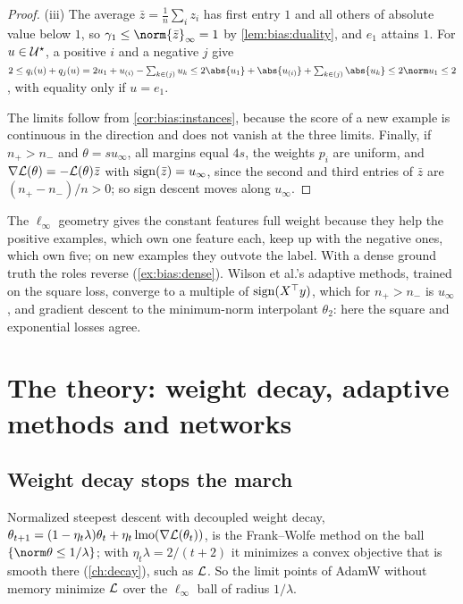 \begin{refsection}
\begin{proof}
(iii) The average $\bar z=\frac1n\sum_iz_i$ has first entry $1$ and all others of absolute value below $1$, so $\gamma_1\le\norm{\bar z}_\infty=1$ by \cref{lem:bias:duality}, and $e_1$ attains $1$. For $u\in\mathcal{U}^\star$, a positive $i$ and a negative $j$ give $2\le q_i(u)+q_j(u)=2u_1+u_{(i)}-\sum_{k\in(j)}u_k\le2\abs{u_1}+\abs{u_{(i)}}+\sum_{k\in(j)}\abs{u_k}\le2\norm u_1\le2$, with equality only if $u=e_1$.

The limits follow from \cref{cor:bias:instances}, because the score of a new example is continuous in the direction and does not vanish at the three limits. Finally, if $n_+>n_-$ and $\theta=su_\infty$, all margins equal $4s$, the weights $p_i$ are uniform, and $\nabla\mathcal{L}(\theta)=-\mathcal{L}(\theta)\bar z$ with $\operatorname{sign}(\bar z)=u_\infty$, since the second and third entries of $\bar z$ are $(n_+-n_-)/n>0$; so sign descent moves along $u_\infty$.
\end{proof}

The $\ell_\infty$ geometry gives the constant features full weight because they help the positive examples, which own one feature each, keep up with the negative ones, which own five; on new examples they outvote the label. With a dense ground truth the roles reverse (\cref{ex:bias:dense}). Wilson et al.'s adaptive methods, trained on the square loss, converge to a multiple of $\operatorname{sign}(X^\top y)$, which for $n_+>n_-$ is $u_\infty$, and gradient descent to the minimum-norm interpolant $\theta_2$: here the square and exponential losses agree.

\section{The theory: weight decay, adaptive methods and networks}\label{sec:bias:beyond}

\subsection{Weight decay stops the march}

Normalized steepest descent with decoupled weight decay, $\theta_{t+1}=(1-\eta_t\lambda)\theta_t+\eta_t\operatorname{lmo}(\nabla\mathcal{L}(\theta_t))$, is the Frank--Wolfe method on the ball $\{\norm\theta\le1/\lambda\}$; with $\eta_t\lambda=2/(t+2)$ it minimizes a convex objective that is smooth there (\cref{ch:decay}), such as $\mathcal{L}$. So the limit points of AdamW without memory minimize $\mathcal{L}$ over the $\ell_\infty$ ball of radius $1/\lambda$.



\end{refsection}
